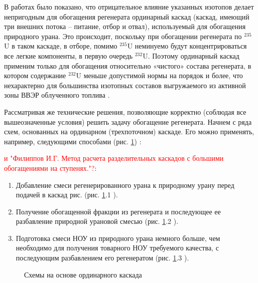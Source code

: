 В работах \cite{sulaberidzeNekotoryhRazdelitelnyhProblemah2004,sulaberidzeProblemsRefinementRecycled4, smirnovKaskadnyeShemyZadachah2012} было показано, что отрицательное влияние указанных изотопов делает непригодным для обогащения регенерата ординарный каскад (каскад, имеющий три внешних потока – питание, отбор и отвал), используемый для обогащения природного урана. Это происходит, поскольку при обогащении регенерата по $^{235}$U в таком каскаде, в отборе, помимо $^{235}$U неминуемо будут концентрироваться все легкие компоненты, в первую очередь $^{232}$U. Поэтому ординарный каскад применим только для обогащения относительно «чистого» состава регенерата, в котором содержание $^{232}$U меньше допустимой нормы на порядок и более, что нехарактерно для большинства изотопных составов выгружаемого из активной зоны ВВЭР облученного топлива \cite{bormanTehnikoekonomicheskiyAnalizVozmozhnyh2012}.

Рассматривая же технические решения, позволяющие корректно (соблюдая все вышеозначенные условия) решить задачу обогащение регенерата. Начнем с ряда схем, основанных на ординарном (трехпоточном) каскаде.
Его можно применять, например, следующими способами (рис. \ref{fig:diagram1}) \cite{smirnovKaskadnyeShemyZadachah2012}:

\textcolor{red}{и "Филиппов И.Г. Метод расчета разделительных каскадов с большими обогащениями на ступенях."?}:
\begin{enumerate}
  \item Добавление смеси регенерированного урана к природному урану перед подачей в каскад рис. (рис. \ref{fig:diagram1}.1 ).
  \item Получение обогащенной фракции из регенерата и последующее ее разбавление природной урановой смесью (рис. \ref{fig:diagram1}.2 ).
  \item Подготовка смеси НОУ из природного урана немного больше, чем необходимо для получения товарного НОУ требуемого качества, с последующим разбавлением его регенератом (рис. \ref{fig:diagram1}.3 ).
\end{enumerate}

\begin{figure}[ht]
  \caption{Схемы на основе ординарного каскада}\label{fig:diagram1}
\end{figure}

